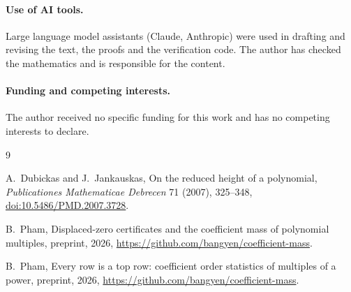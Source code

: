 \documentclass[11pt]{article}
\begin{document}
\paragraph{Use of AI tools.}
Large language model assistants (Claude, Anthropic) were used in drafting
and revising the text, the proofs and the verification code. The author has checked the mathematics and is responsible
for the content.

\paragraph{Funding and competing interests.}
The author received no specific funding for this work and has no competing
interests to declare.

\begin{thebibliography}{9}

A.~Dubickas and J.~Jankauskas,
\newblock On the reduced height of a polynomial,
\newblock \emph{Publicationes Mathematicae Debrecen} 71 (2007), 325--348,
\newblock \href{https://doi.org/10.5486/PMD.2007.3728}
{doi:10.5486/PMD.2007.3728}.

B.~Pham,
\newblock Displaced-zero certificates and the coefficient mass of polynomial
multiples,
\newblock preprint, 2026, \url{https://github.com/bangyen/coefficient-mass}.

B.~Pham,
\newblock Every row is a top row: coefficient order statistics of multiples
of a power,
\newblock preprint, 2026, \url{https://github.com/bangyen/coefficient-mass}.

\end{thebibliography}
\end{document}
